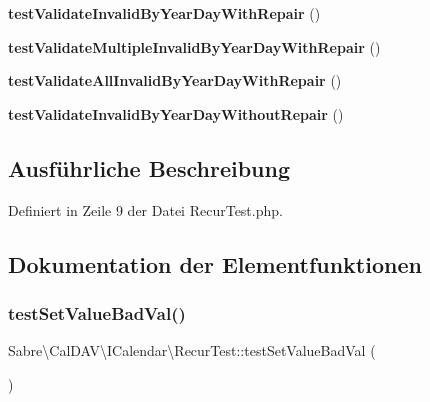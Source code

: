 \begin{DoxyCompactItemize}
{\bfseries test\+Validate\+Invalid\+By\+Year\+Day\+With\+Repair} ()
\item 
\mbox{\label{class_sabre_1_1_v_object_1_1_property_1_1_i_calendar_1_1_recur_test_ac0b543039d4bf02f55951c11672fb59e}} 
{\bfseries test\+Validate\+Multiple\+Invalid\+By\+Year\+Day\+With\+Repair} ()
\item 
\mbox{\label{class_sabre_1_1_v_object_1_1_property_1_1_i_calendar_1_1_recur_test_ae6ae8d752943e4f8206ef6c33f6c6ace}} 
{\bfseries test\+Validate\+All\+Invalid\+By\+Year\+Day\+With\+Repair} ()
\item 
\mbox{\label{class_sabre_1_1_v_object_1_1_property_1_1_i_calendar_1_1_recur_test_abe0acb7a838ed3e9ab8c410a53db7758}} 
{\bfseries test\+Validate\+Invalid\+By\+Year\+Day\+Without\+Repair} ()
\end{DoxyCompactItemize}


\subsection{Ausführliche Beschreibung}


Definiert in Zeile 9 der Datei Recur\+Test.\+php.



\subsection{Dokumentation der Elementfunktionen}
\mbox{\label{class_sabre_1_1_v_object_1_1_property_1_1_i_calendar_1_1_recur_test_a78fb9073d8545234703817c8759dc4e7}} 
\subsubsection{\texorpdfstring{test\+Set\+Value\+Bad\+Val()}{testSetValueBadVal()}}
{\footnotesize\ttfamily Sabre\textbackslash{}\+Cal\+D\+A\+V\textbackslash{}\+I\+Calendar\textbackslash{}\+Recur\+Test\+::test\+Set\+Value\+Bad\+Val (\begin{DoxyParamCaption}{ }\end{DoxyParamCaption})}



